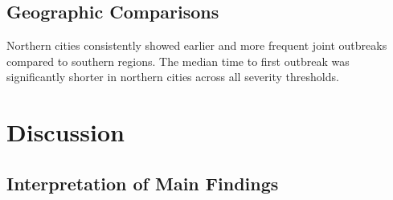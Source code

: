 \documentclass[preprint,12pt]{elsarticle}
\begin{document}



\subsection{Geographic Comparisons}


Northern cities consistently showed earlier and more frequent joint outbreaks compared to southern regions. The median time to first outbreak was significantly shorter in northern cities across all severity thresholds.


\section{Discussion}


\subsection{Interpretation of Main Findings}

\end{document}
